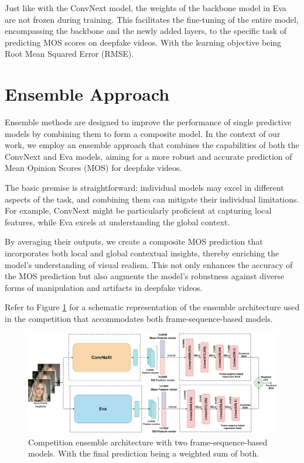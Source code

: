 \documentclass[a4paper,12pt,openright]{book}
\begin{document}
Just like with the ConvNext model, the weights of the backbone model in Eva are not frozen during training. This facilitates the fine-tuning of the entire model, encompassing the backbone and the newly added layers, to the specific task of predicting MOS scores on deepfake videos. With the learning objective being Root Mean Squared Error (RMSE).

\section{Ensemble Approach}
\label{sec:ensemble}

Ensemble methods are designed to improve the performance of single predictive models by combining them to form a composite model. In the context of our work, we employ an ensemble approach that combines the capabilities of both the ConvNext and Eva models, aiming for a more robust and accurate prediction of Mean Opinion Scores (MOS) for deepfake videos. 

The basic premise is straightforward: individual models may excel in different aspects of the task, and combining them can mitigate their individual limitations. For example, ConvNext might be particularly proficient at capturing local features, while Eva excels at understanding the global context.

By averaging their outputs, we create a composite MOS prediction that incorporates both local and global contextual insights, thereby enriching the model's understanding of visual realism. This not only enhances the accuracy of the MOS prediction but also augments the model's robustness against diverse forms of manipulation and artifacts in deepfake videos.

Refer to Figure \ref{fig:ensamble} for a schematic representation of the ensemble architecture used in the competition that accommodates both frame-sequence-based models.

\begin{figure}[h]
\centering
\includegraphics[width=1.1\textwidth]{images/ensemble.drawio.pdf}
\caption{Competition ensemble architecture with two frame-sequence-based models. With the final prediction being a weighted sum of both.}
\label{fig:ensamble}
\end{figure}
\end{document}

